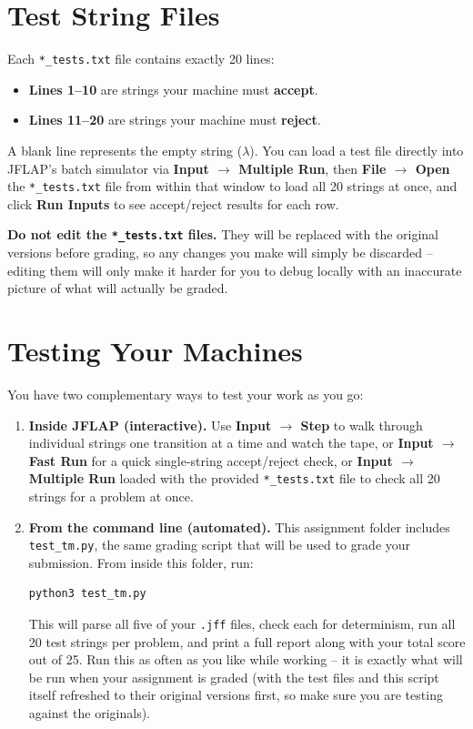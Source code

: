 \documentclass[11pt]{article}
\begin{document}
\section*{Test String Files}

Each \texttt{*\_tests.txt} file contains exactly 20 lines:

\begin{itemize}
  \item \textbf{Lines 1--10} are strings your machine must \textbf{accept}.
  \item \textbf{Lines 11--20} are strings your machine must \textbf{reject}.
\end{itemize}

A blank line represents the empty string ($\lambda$). You can load a
test file directly into JFLAP's batch simulator via
\textbf{Input $\to$ Multiple Run}, then \textbf{File $\to$ Open} the
\texttt{*\_tests.txt} file from within that window to load all 20 strings
at once, and click \textbf{Run Inputs} to see accept/reject results for
each row.

\textbf{Do not edit the \texttt{*\_tests.txt} files.} They will be
replaced with the original versions before grading, so any changes you
make will simply be discarded -- editing them will only make it harder
for you to debug locally with an inaccurate picture of what will actually
be graded.

\section*{Testing Your Machines}

You have two complementary ways to test your work as you go:

\begin{enumerate}
\item \textbf{Inside JFLAP (interactive).} Use \textbf{Input $\to$
Step} to walk through individual strings one transition at a time and
watch the tape, or \textbf{Input $\to$ Fast Run} for a quick single-string
accept/reject check, or \textbf{Input $\to$ Multiple Run} loaded with the
provided \texttt{*\_tests.txt} file to check all 20 strings for a problem
at once.

\item \textbf{From the command line (automated).} This assignment folder
includes \texttt{test\_tm.py}, the same grading script that will be used
to grade your submission. From inside this folder, run:
\begin{lstlisting}
python3 test_tm.py
\end{lstlisting}
This will parse all five of your \texttt{.jff} files, check each for
determinism, run all 20 test strings per problem, and print a full report
along with your total score out of 25. Run this as often as you like
while working -- it is exactly what will be run when your assignment is
graded (with the test files and this script itself refreshed to their
original versions first, so make sure you are testing against the
originals).
\end{enumerate}
\end{document}
